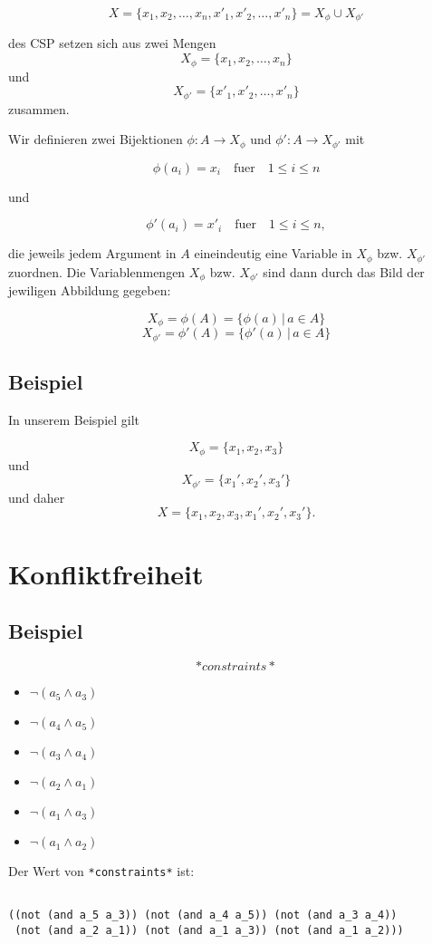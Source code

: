 \[ X  = \{x_1,x_2,\dots,x_n,x'_1,x'_2,\dots,x'_n\} = X_{\phi} \cup X_{\phi'} \]

des CSP setzen sich aus zwei Mengen \[X_{\phi} = \{x_1,x_2,\dots,x_n\}
\] und \[X_{\phi'} = \{x'_1,x'_2,\dots,x'_n\} \] zusammen.

Wir definieren zwei Bijektionen $\phi \colon A \to X_{\phi}$ und
$\phi' \colon A \to X_{\phi'}$ mit

\[ \phi(a_i) = x_i \quad \text{fuer} \quad 1 \leq i \leq  n \]

und

\[ \phi'(a_i) = x'_i \quad \text{fuer} \quad 1 \leq i \leq  n,\]

die jeweils jedem Argument in $A$ eineindeutig eine Variable in
$X_{\phi}$ bzw. $X_{\phi'}$ zuordnen. Die Variablenmengen $X_{\phi}$
bzw. $X_{\phi'}$ sind dann durch das Bild der jewiligen Abbildung
gegeben:

\[ X_{\phi}  = \phi(A) = \{ \phi(a) \,|\, a \in A \} \]
\[ X_{\phi'}  = \phi'(A) = \{ \phi'(a) \,|\, a \in A \} \]

\subsection{Beispiel}\label{beispiel-1}

In unserem Beispiel gilt

\[ X_{\phi} = \{x_1,x_2,x_3\} \] und \[ X_{\phi'} = \{x_1',x_2',x_3'\}\]
und daher \[ X = \{x_1,x_2,x_3,x_1',x_2',x_3'\}.\]

\section{Konfliktfreiheit}\label{konfliktfreiheit}

\subsection{Beispiel}\label{beispiel-2}

\[*constraints*\]

\begin{itemize}
\itemsep1pt\parskip0pt
\item
  $\lnot ( a_5 \land a_3 ) $
\item
  $\lnot ( a_4 \land a_5 ) $
\item
  $\lnot ( a_3 \land a_4 ) $
\item
  $\lnot ( a_2 \land a_1 ) $
\item
  $\lnot ( a_1 \land a_3 ) $
\item
  $\lnot ( a_1 \land a_2 ) $
\end{itemize}

Der Wert von \texttt{*constraints*} ist:

\begin{verbatim}

((not (and a_5 a_3)) (not (and a_4 a_5)) (not (and a_3 a_4))
 (not (and a_2 a_1)) (not (and a_1 a_3)) (not (and a_1 a_2)))
\end{verbatim}
